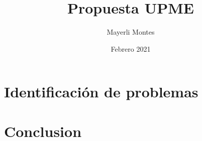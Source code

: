 \documentclass{article}
\title{Propuesta UPME}
\author{Mayerli Montes }
\date{Febrero 2021}
\begin{document}
\maketitle

\section{Identificación de problemas}



\section{Conclusion}
 \citep{adams1995hitchhiker}



\end{document}
